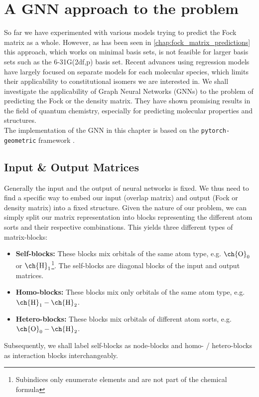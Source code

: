 \chapter{A GNN approach to the problem}
\label{chap:gnn}
So far we have experimented with various models trying to predict the Fock matrix as a whole. However, as has been seen in \autoref{chap:fock_matrix_predictions} this approach, which works on minimal basis sets, is not feasible for larger basis sets such as the 6-31G(2df,p) basis set. Recent advances using regression models have largely focused on separate models for each molecular species, which limits their applicability to constitutional isomers we are interested in. \parencite{ref:Hazra2024,ref:Shao2023}
We shall investigate the applicability of Graph Neural Networks (GNNs) to the problem of predicting the Fock or the density matrix. They have shown promising results in the field of quantum chemistry, especially for predicting molecular properties and structures. \parencite{ref:schnet2018}\\

The implementation of the GNN in this chapter is based on the \texttt{pytorch-geometric} framework \parencite{ref:PyTorchGeometric, ref:PyTorch_geom_paper}. 
\section{Input \& Output Matrices}
\label{sec:gnn_input_output_matrices}
Generally the input and the output of neural networks is fixed. We thus need to find a specific way to embed our input (overlap matrix) and output (Fock or density matrix) into a fixed structure. Given the nature of our problem, we can simply split our matrix representation into blocks representing the different atom sorts and their respective combinations. This yields three different types of matrix-blocks: 
\begin{itemize}
    \item \textbf{Self-blocks:} These blocks mix orbitals of the same atom type, e.g. $\text{\ch{O}}_0$ or $\text{\ch{H}}_1$\footnote{Subindices only enumerate elements and are not part of the chemical formula}. The self-blocks are diagonal blocks of the input and output matrices.
    \item \textbf{Homo-blocks:} These blocks mix only orbitals of the same atom type, e.g. $\text{\ch{H}}_1 - \text{\ch{H}}_2$.
    \item \textbf{Hetero-blocks:} These blocks mix orbitals of different atom sorts, e.g. $\text{\ch{O}}_0 - \text{\ch{H}}_2$.
\end{itemize}
Subsequently, we shall label self-blocks as node-blocks and homo- / hetero-blocks as interaction blocks interchangeably. 

